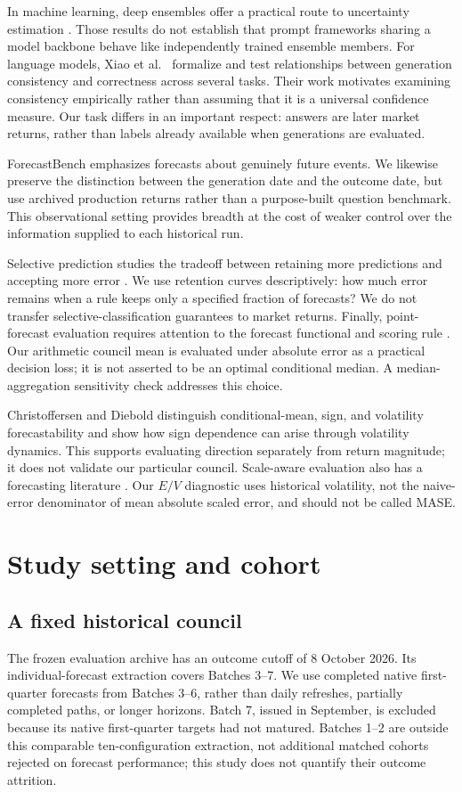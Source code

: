 \documentclass[11pt]{article}
\begin{document}
In machine learning, deep ensembles offer a practical route to uncertainty estimation \cite{lakshminarayanan2017}. Those results do not establish that prompt frameworks sharing a model backbone behave like independently trained ensemble members. For language models, Xiao et al.\ \cite{xiao2025} formalize and test relationships between generation consistency and correctness across several tasks. Their work motivates examining consistency empirically rather than assuming that it is a universal confidence measure. Our task differs in an important respect: answers are later market returns, rather than labels already available when generations are evaluated.

ForecastBench \cite{karger2024} emphasizes forecasts about genuinely future events. We likewise preserve the distinction between the generation date and the outcome date, but use archived production returns rather than a purpose-built question benchmark. This observational setting provides breadth at the cost of weaker control over the information supplied to each historical run.

Selective prediction studies the tradeoff between retaining more predictions and accepting more error \cite{elyaniv2010}. We use retention curves descriptively: how much error remains when a rule keeps only a specified fraction of forecasts? We do not transfer selective-classification guarantees to market returns. Finally, point-forecast evaluation requires attention to the forecast functional and scoring rule \cite{gneiting2011}. Our arithmetic council mean is evaluated under absolute error as a practical decision loss; it is not asserted to be an optimal conditional median. A median-aggregation sensitivity check addresses this choice.

Christoffersen and Diebold \cite{christoffersen2006} distinguish conditional-mean, sign, and volatility forecastability and show how sign dependence can arise through volatility dynamics. This supports evaluating direction separately from return magnitude; it does not validate our particular council. Scale-aware evaluation also has a forecasting literature \cite{hyndman2006}. Our $E/V$ diagnostic uses historical volatility, not the naive-error denominator of mean absolute scaled error, and should not be called MASE.

\section{Study setting and cohort}
\subsection{A fixed historical council}
The frozen evaluation archive has an outcome cutoff of 8 October 2026. Its individual-forecast extraction covers Batches 3--7. We use completed native first-quarter forecasts from Batches 3--6, rather than daily refreshes, partially completed paths, or longer horizons. Batch 7, issued in September, is excluded because its native first-quarter targets had not matured. Batches 1--2 are outside this comparable ten-configuration extraction, not additional matched cohorts rejected on forecast performance; this study does not quantify their outcome attrition.
\end{document}
